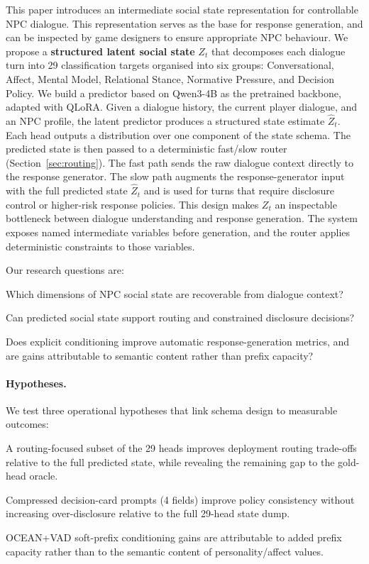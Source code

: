 \documentclass[11pt]{article}
\begin{document}
This paper introduces an intermediate social state representation for controllable NPC dialogue. This representation serves as the base for response generation, and can be inspected by game designers to ensure appropriate NPC behaviour.
We propose a \textbf{structured latent social state} $Z_t$ that decomposes each dialogue turn into 29 classification targets organised into six groups: Conversational, Affect, Mental Model, Relational Stance, Normative Pressure, and Decision Policy. We build a predictor based on Qwen3-4B as the pretrained backbone, adapted with QLoRA. Given a dialogue history, the current player dialogue, and an NPC profile, the latent predictor produces a structured state estimate $\hat{Z}_t$.  Each head outputs a distribution over one component of the state schema.
The predicted state is then passed to a deterministic fast/slow router (Section~\ref{sec:routing}). The fast path sends the raw dialogue context directly to the response generator. The slow path augments the response-generator input with the full predicted state $\hat{Z}_t$ and is used for turns that require disclosure control or higher-risk response policies. 
This design makes $Z_t$ an inspectable bottleneck between dialogue understanding and response generation. The system exposes named intermediate variables before generation, and the router applies deterministic constraints to those variables.

Our research questions are:

\begin{description}  \setlength\itemsep{0em}
    \item[RQ1] Which dimensions of NPC social state are recoverable from dialogue context?
    \item[RQ2] Can predicted social state support routing and constrained disclosure decisions?
    \item[RQ3] Does explicit conditioning improve automatic response-generation metrics, and are gains attributable to semantic content rather than prefix capacity?
\end{description}

\paragraph{Hypotheses.}
We test three operational hypotheses that link schema design to measurable outcomes:

\begin{description} \setlength\itemsep{0em}
    \item[H1 (Compression)] A routing-focused subset of the 29 heads improves deployment routing trade-offs relative to the full predicted state, while revealing the remaining gap to the gold-head oracle.
    \item[H2 (Calibration)] Compressed decision-card prompts (4 fields) improve policy consistency without increasing over-disclosure relative to the full 29-head state dump.
    \item[H3 (Placebo Control)] OCEAN+VAD soft-prefix conditioning gains are attributable to added prefix capacity rather than to the semantic content of personality/affect values.
\end{description}
\end{document}
